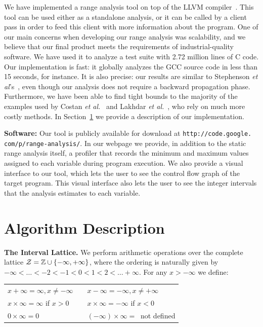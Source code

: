 \documentclass{paper}
\begin{document}
We have implemented a range analysis tool on top of the LLVM
compiler~\cite{Lattner04}.
This tool can be used either as a standalone analysis, or it can be called by a
client pass in order to feed this client with more information about the
program.
One of our main concerns when developing our range analysis was scalability,
and we believe that our final product meets the requirements of
industrial-quality software.
We have used it to analyze a test suite with 2.72 million lines of C code.
Our implementation is fast: it globally analyzes the GCC source code in less than
15 seconds, for instance. 
It is also precise: our results are similar to Stephenson
{\em et al}'s~\cite{Stephenson00}, even though our analysis does not require
a backward propagation phase.
Furthermore, we have been able to find tight bounds to the majority of the
examples used by Costan {\em et al.}~\cite{Costan05} and Lakhdar
{\em et al.}~\cite{Lakhdar11}, who rely on much more costly methods.
In Section~\ref{sec:dsc} we provide a description of our implementation.

\noindent
\textbf{Software: }
Our tool is publicly available for
download at \texttt{http://code.google.} \texttt{com/p/range-analysis/}.
In our webpage we provide, in addition to the static range analysis itself,
a profiler that records the minimum and maximum values assigned to each
variable during program execution.
We also provide a visual interface to our tool, which lets the user to
see the control flow graph of the target program.
This visual interface also lets the user to see the integer intervals that
the analysis estimates to each variable.


\section{Algorithm Description}
\label{sec:dsc}

\noindent
\textbf{The Interval Lattice.}
We perform arithmetic operations over the complete lattice
$\cal{Z} = \mathbb{Z} \cup \{-\infty, +\infty\}$, where the ordering is
naturally given by $-\infty < \ldots < -2 < -1 < 0 < 1 < 2 < \ldots +\infty$.
For any $x > -\infty$ we define:

\begin{tabular}{lcl}
$x + \infty = \infty, x \neq -\infty$ & \mbox{\hspace{0.1cm}} & $x - \infty = - \infty, x \neq +\infty$ \\
$x \times \infty = \infty$ if $x > 0$ & & $x \times \infty = -\infty$ if $x < 0$ \\
$0 \times \infty = 0$ & & $(-\infty) \times \infty = \ $ not defined  \\
\end{tabular}
\end{document}
